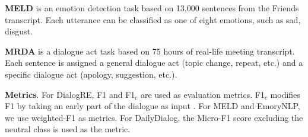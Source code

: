 \textbf{MELD} \citep{poria-etal-2019-meld} is an emotion detection task based on 13,000 sentences from the Friends transcript. Each utterance can be classified as one of eight emotions, such as sad, disgust. %


\textbf{MRDA} \citep{MRDA} is a dialogue act task based on 75 hours of real-life meeting transcript. Each sentence is assigned a general dialogue act (topic change, repeat, etc.) and a specific dialogue act (apology, suggestion, etc.).  %

\textbf{Metrics}. For DialogRE, F1 and F1$_c$ are used as evaluation metrics. F1$_c$ modifies F1 by taking an early part of the dialogue as input \cite{yu-etal-2020-dialogue}. For MELD and EmoryNLP, we use weighted-F1 as metrics. For DailyDialog, the Micro-F1 score excluding the neutral class is used as the metric. 





